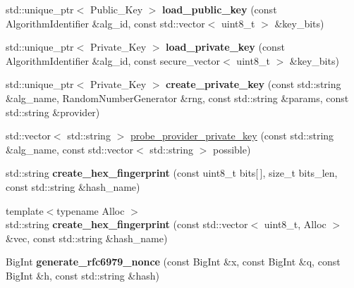 \begin{DoxyCompactItemize}
\item 
\mbox{\label{namespace_botan_a2f60379e6b6d63760ff2f008b2336482}} 
std\+::unique\+\_\+ptr$<$ Public\+\_\+\+Key $>$ {\bfseries load\+\_\+public\+\_\+key} (const Algorithm\+Identifier \&alg\+\_\+id, const std\+::vector$<$ uint8\+\_\+t $>$ \&key\+\_\+bits)
\item 
\mbox{\label{namespace_botan_a21ebf459fd248e8172060e75c9f0e7b9}} 
std\+::unique\+\_\+ptr$<$ Private\+\_\+\+Key $>$ {\bfseries load\+\_\+private\+\_\+key} (const Algorithm\+Identifier \&alg\+\_\+id, const secure\+\_\+vector$<$ uint8\+\_\+t $>$ \&key\+\_\+bits)
\item 
\mbox{\label{namespace_botan_a4678f1d5c0f5bef2a0ac213587c1e53f}} 
std\+::unique\+\_\+ptr$<$ Private\+\_\+\+Key $>$ {\bfseries create\+\_\+private\+\_\+key} (const std\+::string \&alg\+\_\+name, Random\+Number\+Generator \&rng, const std\+::string \&params, const std\+::string \&provider)
\item 
std\+::vector$<$ std\+::string $>$ \mbox{\hyperlink{namespace_botan_ac80126ae204756cd304ffeab9085c6f4}{probe\+\_\+provider\+\_\+private\+\_\+key}} (const std\+::string \&alg\+\_\+name, const std\+::vector$<$ std\+::string $>$ possible)
\item 
\mbox{\label{namespace_botan_abc9af5b1d05ba0ff3aa227c9cec30414}} 
std\+::string {\bfseries create\+\_\+hex\+\_\+fingerprint} (const uint8\+\_\+t bits\mbox{[}$\,$\mbox{]}, size\+\_\+t bits\+\_\+len, const std\+::string \&hash\+\_\+name)
\item 
\mbox{\label{namespace_botan_a2c2ef503f22a2ecf449c39d1a42b6fea}} 
{\footnotesize template$<$typename Alloc $>$ }\\std\+::string {\bfseries create\+\_\+hex\+\_\+fingerprint} (const std\+::vector$<$ uint8\+\_\+t, Alloc $>$ \&vec, const std\+::string \&hash\+\_\+name)
\item 
\mbox{\label{namespace_botan_a855627e1a2d03d45cd260fee98e20034}} 
Big\+Int {\bfseries generate\+\_\+rfc6979\+\_\+nonce} (const Big\+Int \&x, const Big\+Int \&q, const Big\+Int \&h, const std\+::string \&hash)
\item 
\mbox{\label{namespace_botan_aff738894189bc8efe9b9fd1627bfa87b}} 

\end{DoxyCompactItemize}
